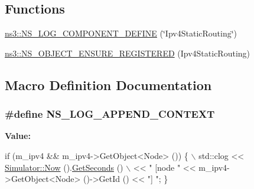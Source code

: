 \subsection*{Functions}
\begin{DoxyCompactItemize}
\item 
\hyperlink{namespacens3_ac198c71b199eb719bc5eb39744c4bf9c}{ns3\+::\+N\+S\+\_\+\+L\+O\+G\+\_\+\+C\+O\+M\+P\+O\+N\+E\+N\+T\+\_\+\+D\+E\+F\+I\+NE} (\char`\"{}Ipv4\+Static\+Routing\char`\"{})
\item 
\hyperlink{namespacens3_ad0cde88f41fd7495a5478efb193971e3}{ns3\+::\+N\+S\+\_\+\+O\+B\+J\+E\+C\+T\+\_\+\+E\+N\+S\+U\+R\+E\+\_\+\+R\+E\+G\+I\+S\+T\+E\+R\+ED} (Ipv4\+Static\+Routing)
\end{DoxyCompactItemize}


\subsection{Macro Definition Documentation}
\subsubsection[{\texorpdfstring{N\+S\+\_\+\+L\+O\+G\+\_\+\+A\+P\+P\+E\+N\+D\+\_\+\+C\+O\+N\+T\+E\+XT}{NS_LOG_APPEND_CONTEXT}}]{\setlength{\rightskip}{0pt plus 5cm}\#define N\+S\+\_\+\+L\+O\+G\+\_\+\+A\+P\+P\+E\+N\+D\+\_\+\+C\+O\+N\+T\+E\+XT}\hypertarget{ipv4-static-routing_8cc_abe50035652d407c40bdaef78214c4955}{}\label{ipv4-static-routing_8cc_abe50035652d407c40bdaef78214c4955}
{\bfseries Value\+:}
\begin{DoxyCode}
\textcolor{keywordflow}{if} (m\_ipv4 && m\_ipv4->GetObject<Node> ()) \{ \(\backslash\)
      std::clog << \hyperlink{group__simulator_gac3635e2e87f7ce316c89290ee1b01d0d}{Simulator::Now} ().\hyperlink{classns3_1_1Time_a8f20d5c3b0902d7b4320982f340b57c8}{GetSeconds} () \(\backslash\)
                << \textcolor{stringliteral}{" [node "} << m\_ipv4->GetObject<Node> ()->GetId () << \textcolor{stringliteral}{"] "}; \}
\end{DoxyCode}
